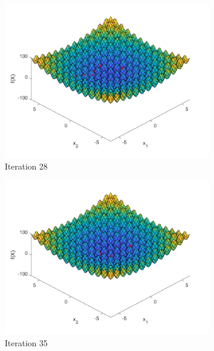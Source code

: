 \begin{figure}
\begin{subfigure}[b]{0.4\textwidth}
    \includegraphics[width=\textwidth]{img/smpl/rast2d/loa-iter-28}
    \caption{Iteration 28}
    \label{fig:s3-iter-4}
  \end{subfigure}
  \begin{subfigure}[b]{0.4\textwidth}
    \includegraphics[width=\textwidth]{img/smpl/rast2d/loa-iter-35}
    \caption{Iteration 35}
    \label{fig:s3-iter-5}
  \end{subfigure}
  \begin{subfigure}[b]{0.4\textwidth}

\end{subfigure}
\end{figure}
